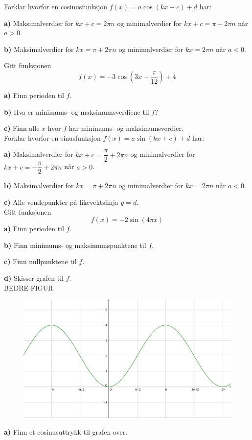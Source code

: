 %




\nes
\op	
Forklar hvorfor en cosinusfunksjon $ f(x)=a\cos(kx+c)+d $ har:

\textbf{a)} Maksimalverdier for $ kx+c= 2\pi n$ og minimalverdier for $ kx+c= \pi + 2\pi n $ når $ a>0 $.

\textbf{b)} Maksimalverdier for $ kx= \pi+2\pi n$ og minimalverdier for $ kx= 2\pi n $ når $ a<0 $. 

\op
Gitt funksjonen 
\[ f(x)=-3\cos\left(3x+\frac{\pi}{12}\right)+4 \]

\textbf{a)} Finn perioden til $ f $.

\textbf{b)} Hva er minimums- og maksimumsverdiene til $ f $?

\textbf{c)} Finn alle $ x $ hvor $ f $ har minimums- og maksimumsverdier.
\\

\op	
Forklar hvorfor en sinusfunksjon $ f(x)=a\sin(kx+c)+d $ har:

\textbf{a)} Maksimalverdier for $ kx+c=\dfrac{\pi}{2}+ 2\pi n$ og minimalverdier for $ kx+c= -\dfrac{\pi}{2} + 2\pi n $ når $ a>0 $.

\textbf{b)} Maksimalverdier for $ kx= \pi+2\pi n$ og minimalverdier for $ kx= 2\pi n $ når $ a<0 $. 

\textbf{c)} Alle vendepunkter på likevektslinja $ y=d $.\\


\op
Gitt funksjonen 
\[ f(x)=-2\sin(4\pi x) \]
\textbf{a)} Finn perioden til $ f $.

\textbf{b)} Finn minimums- og maksimumspunktene til $ f $.

\textbf{c)} Finn nullpunktene til $ f $.

\textbf{d)} Skisser grafen til $ f $.
\\

\op
BEDRE FIGUR
\vs
\begin{figure}
	\centering
	\includegraphics[scale=1]{sinkurv}
\end{figure}
\textbf{a)} Finn et cosinusuttrykk til grafen over.

